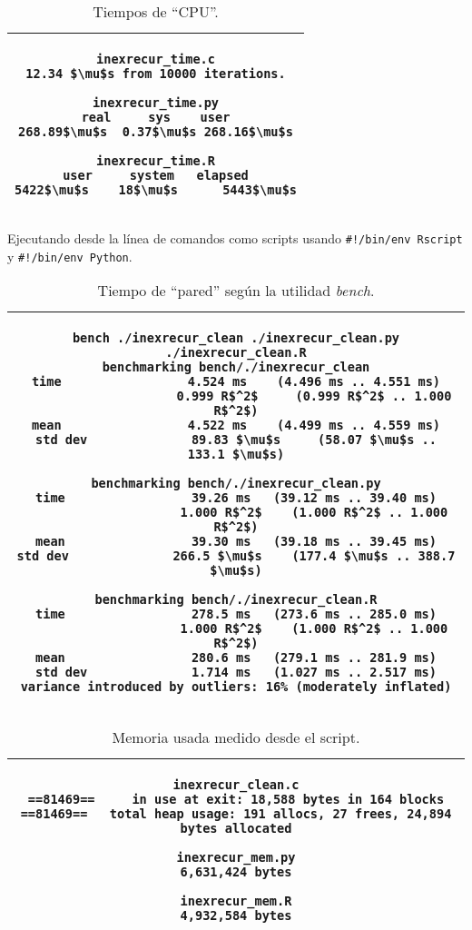 \documentclass{article}
\newcommand{\tempcaption}{}
\newenvironment{codesnip}[1]
{
\begin{table}[h!]
\gdef\tempcaption{#1}
\centering
\begin{tabular}{|c|}
\hline
}
{
\\\hline
\end{tabular}
\caption{\tempcaption}
\end{table}
}
\begin{document}
\clearpage
\phantom{}
\vfill
\begin{codesnip}{Tiempos de ``CPU''.}
\begin{lstlisting}
inexrecur_time.c
12.34 $\mu$s from 10000 iterations.

inexrecur_time.py
real     sys    user
268.89$\mu$s  0.37$\mu$s 268.16$\mu$s

inexrecur_time.R
user     system   elapsed
5422$\mu$s    18$\mu$s      5443$\mu$s
\end{lstlisting}
\end{codesnip}
\vfill
Ejecutando desde la línea de comandos como scripts usando
\texttt{\#!/bin/env Rscript} y \texttt{\#!/bin/env Python}.
\begin{codesnip}{Tiempo de ``pared'' según la utilidad \textit{bench}.}
\begin{lstlisting}
bench ./inexrecur_clean ./inexrecur_clean.py ./inexrecur_clean.R
benchmarking bench/./inexrecur_clean
time                 4.524 ms    (4.496 ms .. 4.551 ms)
                     0.999 R$^2$     (0.999 R$^2$ .. 1.000 R$^2$)
mean                 4.522 ms    (4.499 ms .. 4.559 ms)
std dev              89.83 $\mu$s     (58.07 $\mu$s .. 133.1 $\mu$s)

benchmarking bench/./inexrecur_clean.py
time                 39.26 ms   (39.12 ms .. 39.40 ms)
                     1.000 R$^2$    (1.000 R$^2$ .. 1.000 R$^2$)
mean                 39.30 ms   (39.18 ms .. 39.45 ms)
std dev              266.5 $\mu$s    (177.4 $\mu$s .. 388.7 $\mu$s)

benchmarking bench/./inexrecur_clean.R
time                 278.5 ms   (273.6 ms .. 285.0 ms)
                     1.000 R$^2$    (1.000 R$^2$ .. 1.000 R$^2$)
mean                 280.6 ms   (279.1 ms .. 281.9 ms)
std dev              1.714 ms   (1.027 ms .. 2.517 ms)
variance introduced by outliers: 16% (moderately inflated)
\end{lstlisting}
\end{codesnip}
\vfill
\begin{codesnip}{Memoria usada medido desde el script.}
\begin{lstlisting}
inexrecur_clean.c
==81469==     in use at exit: 18,588 bytes in 164 blocks
==81469==   total heap usage: 191 allocs, 27 frees, 24,894 bytes allocated

inexrecur_mem.py
6,631,424 bytes

inexrecur_mem.R
4,932,584 bytes
\end{lstlisting}
\end{codesnip}
\end{document}
